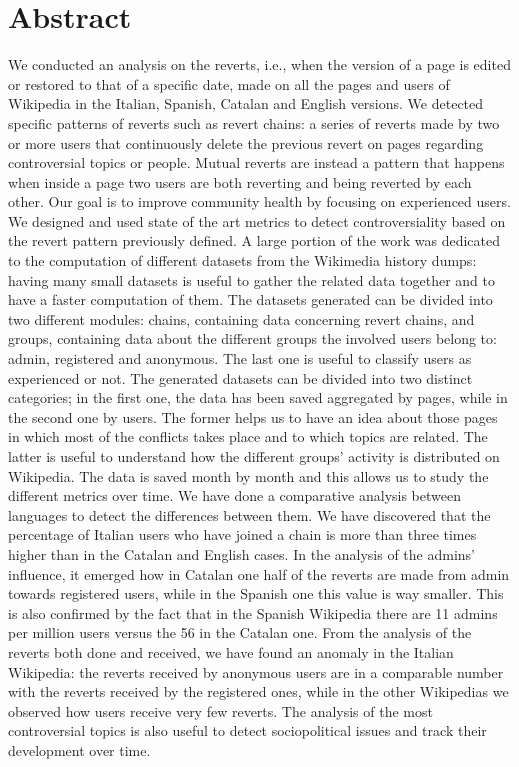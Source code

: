 \chapter*{Abstract} %
\label{sommario}
% 
We conducted an analysis on the reverts, i.e., when the version of a page is edited or restored to
that of a specific date, made on all the pages and users of Wikipedia in the Italian, Spanish,
Catalan and English versions. We detected specific patterns of reverts such as revert chains: a
series of reverts made by two or more users that continuously delete the previous revert on pages
regarding controversial topics or people. Mutual reverts are instead a pattern that happens when
inside a page two users are both reverting and being reverted by each other. Our goal is to improve
community health by focusing on experienced users. We designed and used state of the art metrics to
detect controversiality based on the revert pattern previously defined. A large portion of the work
was dedicated to the computation of different datasets from the Wikimedia history dumps: having many
small datasets is useful to gather the related data together and to have a faster computation of
them. The datasets generated can be divided into two different modules: chains, containing data
concerning revert chains, and groups, containing data about the different groups the involved users
belong to: admin, registered and anonymous. The last one is useful to classify users as experienced
or not. The generated datasets can be divided into two distinct categories; in the first one, the data
has been saved aggregated by pages, while in the second one by users. The former helps us to have an
idea about those pages in which most of the conflicts takes place and to which topics are related.
The latter is useful to understand how the different groups' activity is distributed on Wikipedia.
The data is saved month by month and this allows us to study the different metrics over time. We
have done a comparative analysis between languages to detect the differences between them. We have
discovered that the percentage of Italian users who have joined a chain is more than three times
higher than in the Catalan and English cases. In the analysis of the admins' influence, it emerged
how in Catalan one half of the reverts are made from admin towards registered users, while in
the Spanish one this value is way smaller. This is also confirmed by the fact that in the Spanish
Wikipedia there are 11 admins per million users versus the 56 in the Catalan one. From the analysis
of the reverts both done and received, we have found an anomaly in the Italian Wikipedia: the
reverts received by anonymous users are in a comparable number with the reverts received by the
registered ones, while in the other Wikipedias we observed how users receive very few reverts. The
analysis of the most controversial topics is also useful to detect sociopolitical issues and track
their development over time. 


